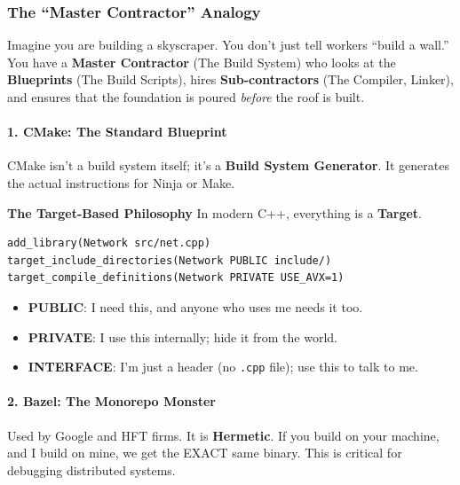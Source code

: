 \hypertarget{the-master-contractor-analogy}{%
\subsubsection{The ``Master Contractor''
Analogy}\label{the-master-contractor-analogy}}

Imagine you are building a skyscraper. You don't just tell workers
``build a wall.'' You have a \textbf{Master Contractor} (The Build
System) who looks at the \textbf{Blueprints} (The Build Scripts), hires
\textbf{Sub-contractors} (The Compiler, Linker), and ensures that the
foundation is poured \emph{before} the roof is built.

\hypertarget{cmake-the-standard-blueprint}{%
\paragraph{1. CMake: The Standard
Blueprint}\label{cmake-the-standard-blueprint}}

CMake isn't a build system itself; it's a \textbf{Build System
Generator}. It generates the actual instructions for Ninja or Make.

\textbf{The Target-Based Philosophy} In modern C++, everything is a
\textbf{Target}.

\begin{lstlisting}
add_library(Network src/net.cpp)
target_include_directories(Network PUBLIC include/)
target_compile_definitions(Network PRIVATE USE_AVX=1)
\end{lstlisting}

\begin{itemize}
\tightlist
\item
  \textbf{PUBLIC}: I need this, and anyone who uses me needs it too.
\item
  \textbf{PRIVATE}: I use this internally; hide it from the world.
\item
  \textbf{INTERFACE}: I'm just a header (no
  \passthrough{\lstinline!.cpp!} file); use this to talk to me.
\end{itemize}

\hypertarget{bazel-the-monorepo-monster}{%
\paragraph{2. Bazel: The Monorepo
Monster}\label{bazel-the-monorepo-monster}}

Used by Google and HFT firms. It is \textbf{Hermetic}. If you build on
your machine, and I build on mine, we get the EXACT same binary. This is
critical for debugging distributed systems.

